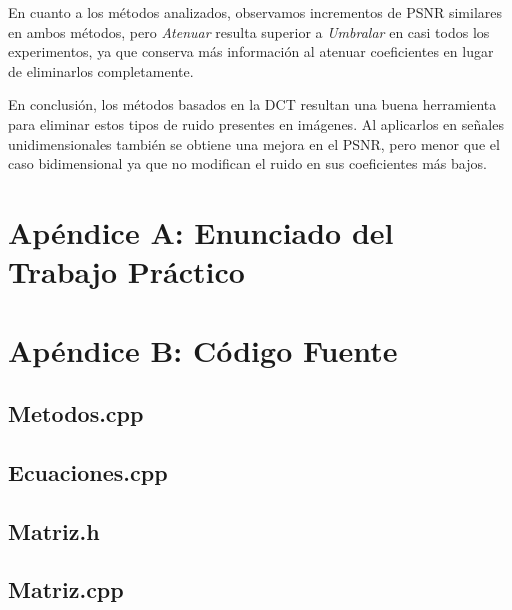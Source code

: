 \documentclass[a4paper,10pt,twoside]{article}
\begin{document}
En cuanto a los métodos analizados, observamos incrementos de PSNR similares en ambos métodos, pero \textit{Atenuar} resulta superior a \textit{Umbralar} en casi todos los experimentos, ya que conserva más información al atenuar coeficientes en lugar de eliminarlos completamente. 

En conclusión, los métodos basados en la DCT resultan una buena herramienta para eliminar estos tipos de ruido presentes en imágenes. Al aplicarlos en señales unidimensionales también se obtiene una mejora en el PSNR, pero menor que el caso bidimensional ya que no modifican el ruido en sus coeficientes más bajos.



\newpage

\section{Apéndice A: Enunciado del Trabajo Práctico}





\newpage

\section{Apéndice B: Código Fuente}

\subsection{Metodos.cpp}


\subsection{Ecuaciones.cpp}


\subsection{Matriz.h}


\subsection{Matriz.cpp}

\end{document}
